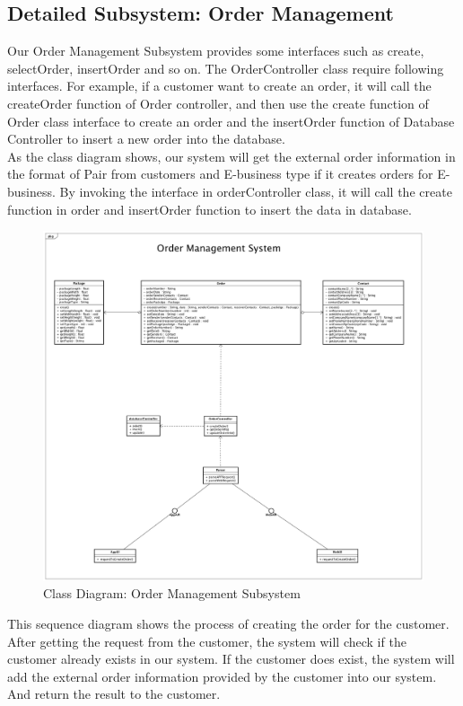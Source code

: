 \documentclass[12pt]{scrreprt}
\begin{document}
\subsection{Detailed Subsystem: Order Management}
Our Order Management Subsystem provides some interfaces such as create, selectOrder, insertOrder and so on. 
The OrderController class require following interfaces. For example, if a customer want to create an order, it will call the createOrder function of Order controller, and then use the create function of Order class interface to create an order and the insertOrder function of Database Controller to insert a new order into the database.\\
As the class diagram shows, our system will get the external order information in the format of Pair from customers and E-business type if it creates orders for E-business. By invoking the interface in orderController class, it will call the create function in order and insertOrder function to insert the data in database.
\begin{figure}[htbp]
	\centering\includegraphics[width=6in]{DocumentRes/ClassDiagramOrderManagement.png}
	\caption{Class Diagram: Order Management Subsystem}
\end{figure}
This sequence diagram shows the process of creating the order for the customer. After getting the request from the customer, the system will check if the customer already exists in our system. If the customer does exist, the system will add the external order information provided by the customer into our system. And return the result to the customer.\\
\end{document}
